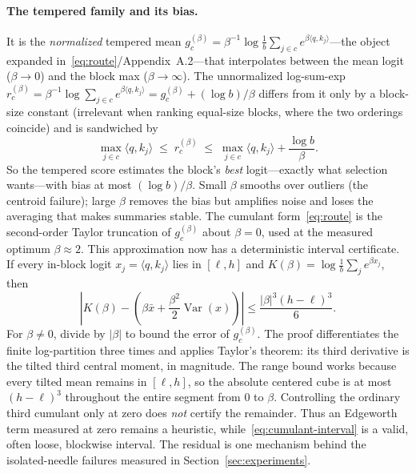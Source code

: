 \documentclass[11pt]{article}
\numberwithin{equation}{section}
\newcommand{\Var}{\operatorname{Var}}
\newcommand{\inner}[2]{\langle #1, #2\rangle}
\begin{document}
\paragraph{The tempered family and its bias.} It is the \emph{normalized} tempered mean
$g_c^{(\beta)}=\beta^{-1}\log\frac1b\sum_{j\in c}e^{\beta\inner{q}{k_j}}$---the object expanded
in~\eqref{eq:route}/Appendix~A.2---that interpolates between the mean logit ($\beta\to0$) and the block max
($\beta\to\infty$). The unnormalized log-sum-exp
$r_c^{(\beta)}=\beta^{-1}\log\sum_{j\in c}e^{\beta\inner{q}{k_j}}=g_c^{(\beta)}+(\log b)/\beta$ differs from
it only by a block-size constant (irrelevant when ranking equal-size blocks, where the two orderings
coincide) and is sandwiched by
\begin{equation}\label{eq:lse}
\max_{j\in c}\inner{q}{k_j} \;\le\; r_c^{(\beta)} \;\le\; \max_{j\in c}\inner{q}{k_j} + \frac{\log b}{\beta}.
\end{equation}
So the tempered score estimates the block's \emph{best} logit---exactly what selection wants---with bias at most
$(\log b)/\beta$. Small $\beta$ smooths over outliers (the centroid failure); large $\beta$ removes the bias
but amplifies noise and loses the averaging that makes summaries stable. The cumulant form~\eqref{eq:route} is
the second-order Taylor truncation of $g_c^{(\beta)}$ about $\beta=0$, used at the measured optimum
$\beta\approx2$. This approximation now has a deterministic interval certificate. If every in-block logit
$x_j=\inner{q}{k_j}$ lies in $[\ell,h]$ and $K(\beta)=\log\frac1b\sum_j e^{\beta x_j}$, then
\begin{equation}\label{eq:cumulant-interval}
\left|K(\beta)-\left(\beta\bar x+\frac{\beta^2}{2}\Var(x)\right)\right|
\le \frac{|\beta|^3(h-\ell)^3}{6}.
\end{equation}
For $\beta\ne0$, divide by $|\beta|$ to bound the error of $g_c^{(\beta)}$. The proof differentiates the
finite log-partition three times and applies Taylor's theorem: its third derivative is the tilted third
central moment, in magnitude. The range bound works because every tilted mean remains in $[\ell,h]$, so the
absolute centered cube is at most $(h-\ell)^3$ throughout the entire segment from $0$ to $\beta$. Controlling
the ordinary third cumulant only at zero does \emph{not} certify the remainder. Thus an Edgeworth term measured
at zero remains a heuristic, while~\eqref{eq:cumulant-interval} is a valid, often loose, blockwise interval.
The residual is one mechanism behind the isolated-needle failures measured in
Section~\ref{sec:experiments}.
\end{document}
